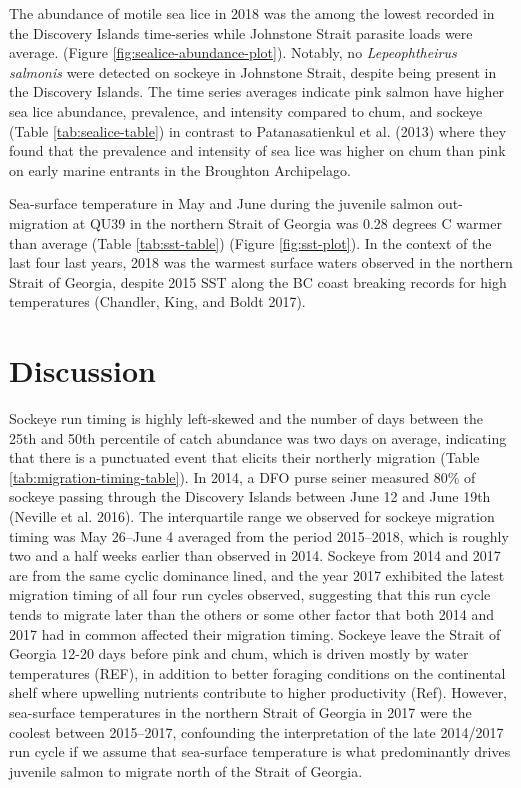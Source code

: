 \documentclass[fleqn,10pt]{wlpeerj} %
\begin{document}
The abundance of motile sea lice in 2018 was the among the lowest recorded in the Discovery Islands time-series while Johnstone Strait parasite loads were average. (Figure \ref{fig:sealice-abundance-plot}). Notably, no \emph{Lepeophtheirus salmonis} were detected on sockeye in Johnstone Strait, despite being present in the Discovery Islands. The time series averages indicate pink salmon have higher sea lice abundance, prevalence, and intensity compared to chum, and sockeye (Table \ref{tab:sealice-table}) in contrast to Patanasatienkul et al. (2013) where they found that the prevalence and intensity of sea lice was higher on chum than pink on early marine entrants in the Broughton Archipelago.

Sea-surface temperature in May and June during the juvenile salmon out-migration at QU39 in the northern Strait of Georgia was 0.28 degrees C warmer than average (Table \ref{tab:sst-table}) (Figure \ref{fig:sst-plot}). In the context of the last four last years, 2018 was the warmest surface waters observed in the northern Strait of Georgia, despite 2015 SST along the BC coast breaking records for high temperatures (Chandler, King, and Boldt 2017).

\hypertarget{discussion}{%
\section{Discussion}\label{discussion}}

Sockeye run timing is highly left-skewed and the number of days between the 25th and 50th percentile of catch abundance was two days on average, indicating that there is a punctuated event that elicits their northerly migration (Table \ref{tab:migration-timing-table}). In 2014, a DFO purse seiner measured 80\% of sockeye passing through the Discovery Islands between June 12 and June 19th (Neville et al. 2016). The interquartile range we observed for sockeye migration timing was May 26--June 4 averaged from the period 2015--2018, which is roughly two and a half weeks earlier than observed in 2014. Sockeye from 2014 and 2017 are from the same cyclic dominance lined, and the year 2017 exhibited the latest migration timing of all four run cycles observed, suggesting that this run cycle tends to migrate later than the others or some other factor that both 2014 and 2017 had in common affected their migration timing. Sockeye leave the Strait of Georgia 12-20 days before pink and chum, which is driven mostly by water temperatures (REF), in addition to better foraging conditions on the continental shelf where upwelling nutrients contribute to higher productivity (Ref). However, sea-surface temperatures in the northern Strait of Georgia in 2017 were the coolest between 2015--2017, confounding the interpretation of the late 2014/2017 run cycle if we assume that sea-surface temperature is what predominantly drives juvenile salmon to migrate north of the Strait of Georgia.
\end{document}
